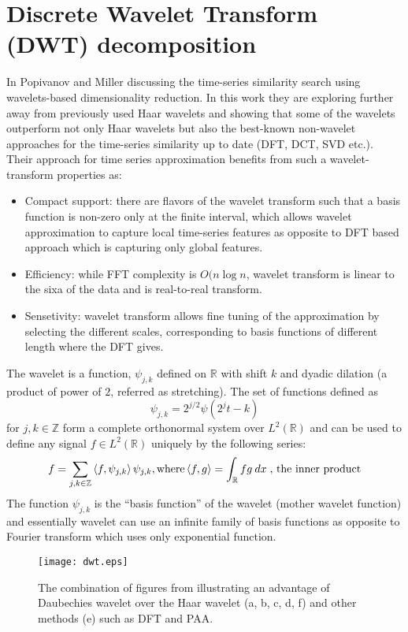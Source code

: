 \section{Discrete Wavelet Transform (DWT) decomposition}
In \cite{citeulike:3734066} Popivanov and Miller discussing the time-series similarity search using wavelets-based dimensionality reduction. In this work they are exploring further away from previously used Haar wavelets \cite{citeulike:4384535} and showing that some of the wavelets outperform not only Haar wavelets but also the best-known non-wavelet approaches for the time-series similarity up to date (DFT, DCT, SVD etc.). Their approach for time series approximation benefits from such a wavelet-transform properties as:
\begin{itemize}
	\item{Compact support: there are flavors of the wavelet transform such that a basis function is non-zero only at the finite interval, which allows wavelet approximation to capture local time-series features as opposite to DFT based approach which is capturing only global features.}
	\item{Efficiency: while FFT complexity is $O(n \log{n}$, wavelet transform is linear to the sixa of the data and is real-to-real transform.}
	\item{Sensetivity: wavelet transform allows fine tuning of the approximation by selecting the different scales, corresponding to basis functions of different length where the DFT gives.}
\end{itemize}

The wavelet is a function, $\psi_{j,k}$ defined on $\mathbb{R}$ with shift $k$ and dyadic dilation (a product of power of $2$, referred as stretching). The set of functions defined as
\begin{equation}
\psi_{j,k} = 2^{j/2} \psi \left( 2^{j}t - k \right)  
\label{eq:wavelet}
\end{equation} 
for $j, k \in \mathbb{Z}$ form a complete orthonormal system over $L^{2}(\mathbb{R})$ and can be used to define any signal $f \in L^{2}(\mathbb{R})$ uniquely by the following series: 
\begin{equation}
f = \sum_{j, k \in \mathbb{Z}} \left\langle f, \psi_{j,k} \right\rangle  \psi_{j,k}, \\
\text{where} \left\langle f,g \right\rangle = \int_{\mathbb{R}} f g \: dx \; \text{, the inner product}
\label{eq:wavelet_series}
\end{equation} 
The function $\psi_{j,k}$ is the ``basis function'' of the wavelet (mother wavelet function) and essentially wavelet can use an infinite family of basis functions as opposite to Fourier transform which uses only exponential function. 
\begin{figure}[tbp]
   \centering
   \texttt{[image: dwt.eps]}
   \caption{The combination of figures from \cite{citeulike:3734066} illustrating an advantage of Daubechies wavelet over the Haar wavelet (a, b, c, d, f) and other methods (e) such as DFT and PAA.}
   \label{fig:dwt}
\end{figure} 

